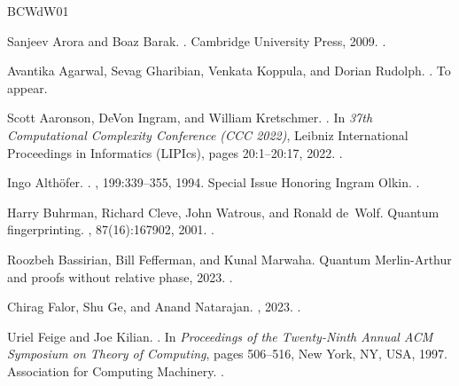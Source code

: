 \documentclass[10pt,a4paper]{article}
\theoremstyle{definition}
\begin{document}
\newcommand{\etalchar}[1]{$^{#1}$}
\begin{thebibliography}{BCWdW01}

Sanjeev Arora and Boaz Barak.
.
\newblock Cambridge University Press, 2009.
\newblock \href {https://doi.org/10.1017/CBO9780511804090}
  {}.

Avantika Agarwal, Sevag Gharibian, Venkata Koppula, and Dorian Rudolph.
.
\newblock To appear.

Scott Aaronson, DeVon Ingram, and William Kretschmer.
.
\newblock In {\em 37th Computational Complexity Conference (CCC 2022)}, Leibniz
  International Proceedings in Informatics (LIPIcs), pages 20:1--20:17, 2022.
\newblock \href {https://doi.org/10.4230/LIPIcs.CCC.2022.20}
  {}.

Ingo Althöfer.
.
, 199:339--355, 1994.
\newblock Special Issue Honoring Ingram Olkin.
\newblock \href {https://doi.org/10.1016/0024-3795(94)90357-3}
  {}.

Harry Buhrman, Richard Cleve, John Watrous, and Ronald de~Wolf.
\newblock Quantum fingerprinting.
, 87(16):167902, 2001.
\newblock \href {https://doi.org/10.1103/PhysRevLett.87.167902}
  {}.

Roozbeh Bassirian, Bill Fefferman, and Kunal Marwaha.
\newblock Quantum {M}erlin-{A}rthur and proofs without relative phase, 2023.
\newblock \href {http://arxiv.org/abs/2306.13247} {}.

Chirag Falor, Shu Ge, and Anand Natarajan.
, 2023.
\newblock \href {http://arxiv.org/abs/2311.12228} {}.

Uriel Feige and Joe Kilian.
.
\newblock In {\em Proceedings of the Twenty-Ninth Annual ACM Symposium on
  Theory of Computing}, pages 506--516, New York, NY, USA, 1997. Association
  for Computing Machinery.
\newblock \href {https://doi.org/10.1145/258533.258644}
  {}.


\end{thebibliography}
\end{document}
